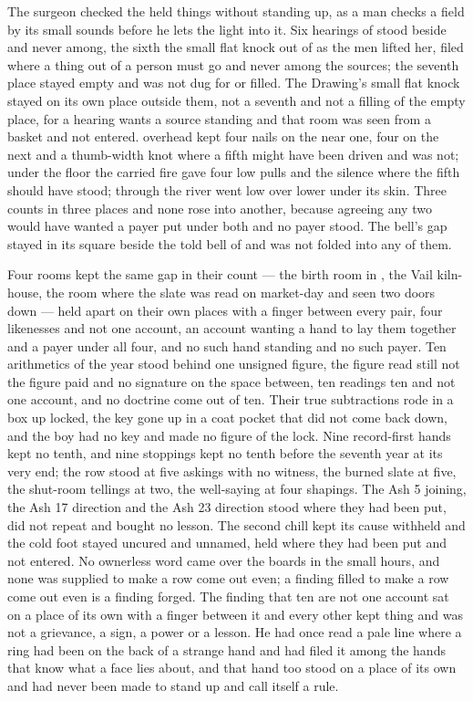 The surgeon checked the held things without standing up, as a man checks a field by its small sounds before he lets the light into it. Six hearings of  stood beside and never among, the sixth the small flat knock out of  as the men lifted her, filed where a thing out of a person must go and never among the sources; the seventh place stayed empty and was not dug for or filled. The Drawing's small flat knock stayed on its own place outside them, not a seventh and not a filling of the empty place, for a hearing wants a source standing and that room was seen from a basket and not entered.  overhead kept four nails on the near one, four on the next and a thumb-width knot where a fifth might have been driven and was not; under the floor the carried fire gave four low pulls and the silence where the fifth should have stood; through  the river went low over lower under its skin. Three counts in three places and none rose into another, because agreeing any two would have wanted a payer put under both and no payer stood. The bell's gap stayed in its square beside the told bell of  and was not folded into any of them.

Four rooms kept the same gap in their count --- the birth room in , the Vail kiln-house, the room where the slate was read on market-day and  seen two doors down --- held apart on their own places with a finger between every pair, four likenesses and not one account, an account wanting a hand to lay them together and a payer under all four, and no such hand standing and no such payer. Ten arithmetics of the year stood behind one unsigned figure, the figure read still not the figure paid and no signature on the space between, ten readings ten and not one account, and no doctrine come out of ten. Their true subtractions rode in a box up  locked, the key gone up in a coat pocket that did not come back down, and the boy had no key and made no figure of the lock. Nine record-first hands kept no tenth, and nine stoppings kept no tenth before the seventh year at its very end; the row stood at five askings with no witness, the burned slate at five, the shut-room tellings at two, the well-saying at four shapings. The Ash 5 joining, the Ash 17 direction and the Ash 23 direction stood where they had been put, did not repeat and bought no lesson. The second chill kept its cause withheld and the cold foot stayed uncured and unnamed, held where they had been put and not entered. No ownerless word came over the boards in the small hours, and none was supplied to make a row come out even; a finding filled to make a row come out even is a finding forged. The finding that ten are not one account sat on a place of its own with a finger between it and every other kept thing and was not a grievance, a sign, a power or a lesson. He had once read a pale line where a ring had been on the back of a strange hand and had filed it among the hands that know what a face lies about, and that hand too stood on a place of its own and had never been made to stand up and call itself a rule.

